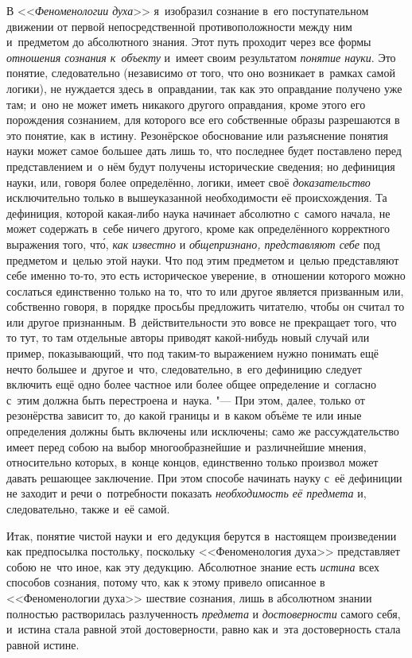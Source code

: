 В <<{\em Феноменологии духа}>> я~изобразил сознание в~его
поступательном движении от первой непосредственной противоположности между
ним и~предметом до абсолютного знания. Этот путь проходит через все формы
{\em отношения сознания к~объекту} и~имеет своим
результатом {\em понятие науки}. Это понятие,
следовательно (независимо от того, что оно возникает в~рамках самой
логики), не нуждается здесь в~оправдании, так как это оправдание получено
уже там; и~оно не может иметь никакого другого оправдания, кроме этого его
порождения сознанием, для которого все его собственные образы разрешаются в
это понятие, как в~истину. Резонёрское обоснование или разъяснение
понятия науки может самое большее дать лишь то, что последнее будет
поставлено перед представлением и~о нём будут получены исторические
сведения; но дефиниция науки, или, говоря более определённо, логики, имеет
своё {\em доказательство} исключительно только в
вышеуказанной необходимости её происхождения. Та дефиниция, которой
какая-либо наука начинает абсолютно с~самого начала, не может содержать в~себе
ничего другого, кроме как определённого корректного выражения того,
чт\'{о}, {\em как известно} и {\em общепризнано, представляют себе}
под предметом и~целью этой
науки. Что под этим предметом и~целью представляют себе именно то-то, это
есть историческое уверение, в~отношении которого можно сослаться
единственно только на то, что то или другое является призванным или,
собственно говоря, в~порядке просьбы предложить читателю, чтобы он считал
то или другое признанным. В~действительности это вовсе не прекращает того,
что то тут, то там отдельные авторы приводят какой-нибудь новый случай или
пример, показывающий, что под таким-то выражением нужно понимать ещё нечто
большее и~другое и~что, следовательно, в~его дефиницию следует включить ещё
одно более частное или более общее определение и~согласно с~этим должна
быть перестроена и~наука. "--- При этом, далее, только от резонёрства
зависит то, до какой границы и~в каком объёме те или иные определения
должны быть включены или исключены; само же рассуждательство имеет перед
собою на выбор многообразнейшие и~различнейшие мнения, относительно
которых, в~конце концов, единственно только произвол может давать решающее
заключение. При этом способе начинать науку с~её дефиниции не заходит и
речи о~потребности показать {\em необходимость её
предмета} и, следовательно, также и~её самой.

Итак, понятие чистой науки и~его дедукция берутся в~настоящем произведении
как предпосылка постольку, поскольку <<Феноменология духа>> представляет
собою не~что иное, как эту дедукцию. Абсолютное знание есть
{\em истина} всех способов сознания, потому что, как к
этому привело описанное в <<Феноменологии духа>> шествие сознания, лишь в
абсолютном знании полностью растворилась разлученность
{\em предмета} и {\em достоверности} самого себя, и~истина стала равной
этой достоверности, равно как и~эта достоверность стала равной истине.

